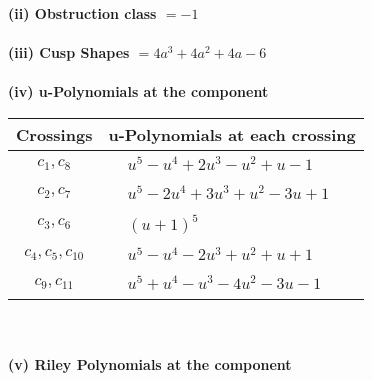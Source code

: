 \documentclass[1p]{elsarticle_modified}
\theoremstyle{definition}
\begin{document}
\flushleft \textbf{(ii) Obstruction class $= -1$}\\~\\
\flushleft \textbf{(iii) Cusp Shapes $= 4 a^3+4 a^2+4 a-6$}\\~\\
\newpage\renewcommand{\arraystretch}{1}
\flushleft \textbf{(iv) u-Polynomials at the component}\newline \\
\begin{tabular}{m{50pt}|m{274pt}}
Crossings & \hspace{64pt}u-Polynomials at each crossing \\
\hline $$\begin{aligned}c_{1},c_{8}\end{aligned}$$&$\begin{aligned}
&u^5- u^4+2 u^3- u^2+u-1
\end{aligned}$\\
\hline $$\begin{aligned}c_{2},c_{7}\end{aligned}$$&$\begin{aligned}
&u^5-2 u^4+3 u^3+u^2-3 u+1
\end{aligned}$\\
\hline $$\begin{aligned}c_{3},c_{6}\end{aligned}$$&$\begin{aligned}
&(u+1)^5
\end{aligned}$\\
\hline $$\begin{aligned}c_{4},c_{5},c_{10}\end{aligned}$$&$\begin{aligned}
&u^5- u^4-2 u^3+u^2+u+1
\end{aligned}$\\
\hline $$\begin{aligned}c_{9},c_{11}\end{aligned}$$&$\begin{aligned}
&u^5+u^4- u^3-4 u^2-3 u-1
\end{aligned}$\\
\hline
\end{tabular}\\~\\
\newpage\renewcommand{\arraystretch}{1}
\flushleft \textbf{(v) Riley Polynomials at the component}\newline \\
\end{document}
